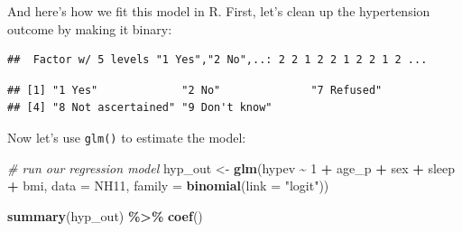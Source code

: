 \documentclass[
]{book}
\newenvironment{Shaded}{\begin{snugshade}}{\end{snugshade}}
\newcommand{\CommentTok}[1]{\textcolor[rgb]{0.56,0.35,0.01}{\textit{#1}}}
\newcommand{\DataTypeTok}[1]{\textcolor[rgb]{0.13,0.29,0.53}{#1}}
\newcommand{\DecValTok}[1]{\textcolor[rgb]{0.00,0.00,0.81}{#1}}
\newcommand{\KeywordTok}[1]{\textcolor[rgb]{0.13,0.29,0.53}{\textbf{#1}}}
\newcommand{\NormalTok}[1]{#1}
\newcommand{\OperatorTok}[1]{\textcolor[rgb]{0.81,0.36,0.00}{\textbf{#1}}}
\newcommand{\StringTok}[1]{\textcolor[rgb]{0.31,0.60,0.02}{#1}}
\begin{document}
And here's how we fit this model in R. First, let's clean up the hypertension outcome by making it binary:

\begin{Shaded}
\end{Shaded}

\begin{verbatim}
##  Factor w/ 5 levels "1 Yes","2 No",..: 2 2 1 2 2 1 2 2 1 2 ...
\end{verbatim}

\begin{Shaded}
\end{Shaded}

\begin{verbatim}
## [1] "1 Yes"             "2 No"              "7 Refused"        
## [4] "8 Not ascertained" "9 Don't know"
\end{verbatim}

\begin{Shaded}
\end{Shaded}

Now let's use \texttt{glm()} to estimate the model:

\begin{Shaded}
\begin{Highlighting}[]
  \CommentTok{\# run our regression model}
\NormalTok{  hyp\_out \textless{}{-}}\StringTok{ }\KeywordTok{glm}\NormalTok{(hypev }\OperatorTok{\textasciitilde{}}\StringTok{ }\DecValTok{1} \OperatorTok{+}\StringTok{ }\NormalTok{age\_p }\OperatorTok{+}\StringTok{ }\NormalTok{sex }\OperatorTok{+}\StringTok{ }\NormalTok{sleep }\OperatorTok{+}\StringTok{ }\NormalTok{bmi,}
                 \DataTypeTok{data =}\NormalTok{ NH11, }
                 \DataTypeTok{family =} \KeywordTok{binomial}\NormalTok{(}\DataTypeTok{link =} \StringTok{"logit"}\NormalTok{))}

  \KeywordTok{summary}\NormalTok{(hyp\_out) }\OperatorTok{\%\textgreater{}\%}\StringTok{ }\KeywordTok{coef}\NormalTok{()}
\end{Highlighting}
\end{Shaded}
\end{document}
